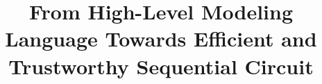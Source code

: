 \documentclass[10pt]{llncs}
\begin{document}
\sloppy
\graphicspath{{figs/}}

\title{From High-Level Modeling Language Towards Efficient and Trustworthy Sequential Circuit}
\author{}

\institute{}

\maketitle













\end{document}
